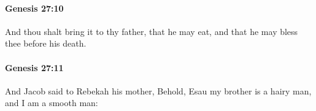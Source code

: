 		\paragraph{Genesis 27:10} %
			\label{GENESIS-27-10}

			And thou shalt bring it to thy father, that he may eat, and that he may bless thee before his death.


		\paragraph{Genesis 27:11} %
			\label{GENESIS-27-11}

			And Jacob said to Rebekah his mother, Behold, Esau my brother is a hairy man, and I am a smooth man:


